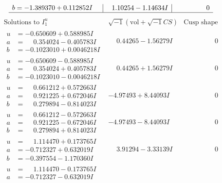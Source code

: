 \documentclass[1p]{elsarticle_modified}
\theoremstyle{definition}
\newcommand{\I}{\sqrt{-1}}
\begin{document}
$$\begin{array}{c|c|c}
\begin{aligned}
b &= -1.389370 + 0.112852 I\end{aligned}
 & \phantom{-}1.10254 - 1.14634 I & \phantom{-0.000000 } 0\\
 \hline 
 \end{array}$$\newpage$$\begin{array}{c|c|c}  
\text{Solutions to }I^u_{1}& \I (\text{vol} + \sqrt{-1}CS) & \text{Cusp shape}\\
 \hline 
\begin{aligned}
u &= -0.650609 + 0.588985 I \\
a &= \phantom{-}0.354024 - 0.405783 I \\
b &= -0.1023010 + 0.0046218 I\end{aligned}
 & \phantom{-}0.44265 - 1.56279 I & \phantom{-0.000000 } 0 \\ \hline\begin{aligned}
u &= -0.650609 - 0.588985 I \\
a &= \phantom{-}0.354024 + 0.405783 I \\
b &= -0.1023010 - 0.0046218 I\end{aligned}
 & \phantom{-}0.44265 + 1.56279 I & \phantom{-0.000000 } 0 \\ \hline\begin{aligned}
u &= \phantom{-}0.661212 + 0.572663 I \\
a &= \phantom{-}0.921225 + 0.672046 I \\
b &= \phantom{-}0.279894 - 0.814023 I\end{aligned}
 & -4.97493 + 8.44093 I & \phantom{-0.000000 } 0 \\ \hline\begin{aligned}
u &= \phantom{-}0.661212 - 0.572663 I \\
a &= \phantom{-}0.921225 - 0.672046 I \\
b &= \phantom{-}0.279894 + 0.814023 I\end{aligned}
 & -4.97493 - 8.44093 I & \phantom{-0.000000 } 0 \\ \hline\begin{aligned}
u &= \phantom{-}1.114470 + 0.173765 I \\
a &= -0.712327 + 0.632019 I \\
b &= -0.397554 - 1.170360 I\end{aligned}
 & \phantom{-}3.91294 - 3.33139 I & \phantom{-0.000000 } 0 \\ \hline\begin{aligned}
u &= \phantom{-}1.114470 - 0.173765 I \\
a &= -0.712327 - 0.632019 I \\

\end{aligned}
\end{array}$$
\end{document}
